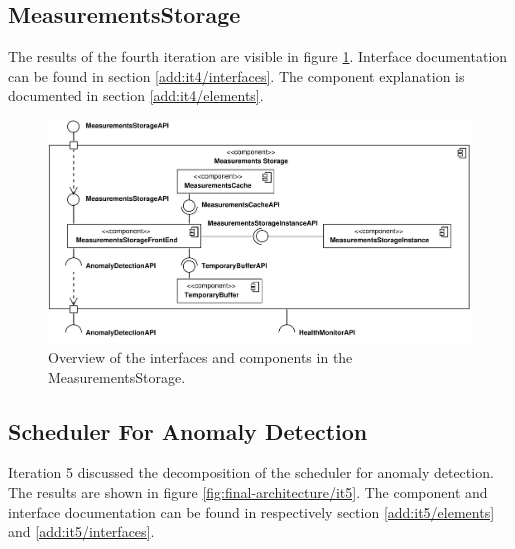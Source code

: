 \subsection{MeasurementsStorage}

\npar The results of the fourth iteration are visible in figure
\ref{fig:final-architecture/it4}. Interface documentation can be found in
section \ref{add:it4/interfaces}. The component explanation is documented in
section \ref{add:it4/elements}.

\begin{figure}[H]
	\begin{centering}
		\includegraphics[width=\textwidth]{figs/add-it4-interfaces.pdf}
		\caption{Overview of the interfaces and components in the
		MeasurementsStorage.}
		\label{fig:final-architecture/it4}
	\end{centering}
\end{figure}

\subsection{Scheduler For Anomaly Detection}

\npar Iteration 5 discussed the decomposition of the scheduler for anomaly
detection. The results are shown in figure \ref{fig:final-architecture/it5}. The
component and interface documentation can be found in respectively section
\ref{add:it5/elements} and \ref{add:it5/interfaces}.

